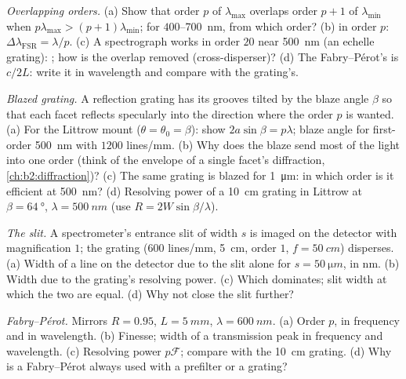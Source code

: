 \begin{exercise}[$\star\star$]\label{exo:b2:gratings:6}
\emph{Overlapping orders.} (a) Show that order $p$ of $\lambda_{\max}$ overlaps
order $p + 1$ of $\lambda_{\min}$ when $p\lambda_{\max} > (p + 1)\lambda_{\min}$; for $400$--\qty{700}{nm},
from which order? (b)  in order $p$: $\Delta\lambda_{\text{FSR}}
= \lambda/p$. (c) A spectrograph works in order $20$ near \qty{500}{nm} (an
echelle grating): ; how is the overlap removed
(cross-disperser)? (d) The Fabry--Pérot's  is $c/2L$:
write it in wavelength and compare with the grating's.
\end{exercise}

\begin{exercise}[$\star\star$]\label{exo:b2:gratings:7}
\emph{Blazed grating.} A reflection grating has its grooves tilted by
the blaze angle $\beta$ so that each facet reflects specularly into the
direction where the order $p$ is wanted. (a) For the Littrow mount
($\theta = \theta_0 = \beta$): show $2a\sin\beta = p\lambda$; blaze angle for first-order
\qty{500}{nm} with $1200$ lines/mm. (b) Why does the blaze send most of the
light into one order (think of the envelope of a single facet's
diffraction, \cref{ch:b2:diffraction})? (c) The same grating is blazed
for \qty{1}{\micro m}: in which order is it efficient at \qty{500}{nm}? (d)
Resolving power of a \qty{10}{cm} grating in Littrow at $\beta = \qty{64}{\degree}$,
$\lambda = \qty{500}{nm}$ (use $R = 2W\sin\beta/\lambda$).
\end{exercise}

\begin{exercise}[$\star\star$]\label{exo:b2:gratings:8}
\emph{The slit.} A spectrometer's entrance slit of width $s$ is imaged
on the detector with magnification $1$; the grating ($600$ lines/mm,
\qty{5}{cm}, order $1$, $f = \qty{50}{cm}$) disperses. (a) Width of a line on
the detector due to the slit alone for $s = \qty{50}{\micro m}$, in nm. (b)
Width due to the grating's resolving power. (c) Which dominates; slit
width at which the two are equal. (d) Why not close the slit further?
\end{exercise}

\begin{exercise}[$\star\star$]\label{exo:b2:gratings:9}
\emph{Fabry--Pérot.} Mirrors $R = 0.95$, $L = \qty{5}{mm}$, $\lambda = \qty{600}{nm}$.
(a) Order $p$,  in frequency and in wavelength. (b)
Finesse; width of a transmission peak in frequency and wavelength. (c)
Resolving power $p\mathcal F$; compare with the \qty{10}{cm} grating. (d) Why
is a Fabry--Pérot always used with a prefilter or a grating?
\end{exercise}

